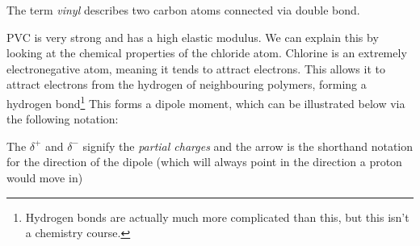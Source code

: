 \begin{itemize}
\begin{itemize}
\begin{center}
        \end{center}
        The term \textit{vinyl} describes two carbon atoms connected via double bond.
    \begin{case}
        PVC is very strong and has a high elastic modulus. We can explain this by looking at the chemical properties of the chloride atom. Chlorine is an extremely electronegative atom, meaning it tends to attract electrons. This allows it to attract electrons from the hydrogen of neighbouring polymers, forming a hydrogen bond\footnote{Hydrogen bonds are actually much more complicated than this, but this isn't a chemistry course.} This forms a dipole moment, which can be illustrated below via the following notation:
        \vspace{4mm}
        \begin{center}
        \end{center}
        \vspace{2mm}
        The $\delta^+$ and $\delta^-$ signify the \textit{partial charges} and the arrow is the shorthand notation for the direction of the dipole (which will always point in the direction a proton would move in)
        \vspace{2mm}


\end{case}
\end{itemize}
\end{itemize}
